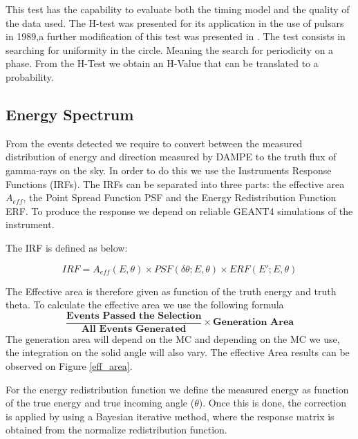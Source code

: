 \documentclass{PoS}
\begin{document}
This test has the capability to evaluate both the timing model and the quality of the data used.  The H-test was presented for its application in the use of pulsars in 1989,a further  modification of this test was presented in \cite{h-test}.  
The test consists in searching for uniformity in the circle.  Meaning the search for  periodicity on  a phase. From the H-Test we obtain an H-Value that can be translated to a probability.
 
 
 



\subsection{Energy Spectrum}
From the  events detected we require to convert between the measured distribution of energy and direction measured by DAMPE to the truth flux of gamma-rays on the sky. In order to do this we use the Instruments Response Functions (IRFs). The IRFs  can be  separated into three parts: the effective area $A_{eff}$, the Point Spread Function PSF and the Energy Redistribution Function ERF. To produce the response we depend on reliable GEANT4 simulations of the instrument. 

The IRF is defined as below:

\begin{equation}
IRF=A_{eff}(E,\theta)\times{PSF}(\delta\theta;E,\theta)\times ERF (E';E,\theta)
\end{equation}

The Effective area is therefore given as function of the truth energy and truth theta. To calculate the effective area we use the following formula
\begin{equation}
\frac{\textbf{Events Passed the Selection}}{\textbf{All Events Generated}}\times {\textbf{Generation Area}}
\end{equation}
The generation area will depend on the  MC and depending on the MC we use, the integration on the solid angle will also vary. The effective Area results can be observed on Figure \ref{eff_area}.

For the energy redistribution function we define the measured energy as function of the true energy and true incoming angle ($\theta$). Once this is done, the correction is applied by using a Bayesian iterative method, where the response matrix is obtained from the normalize redistribution function. 
\end{document}
